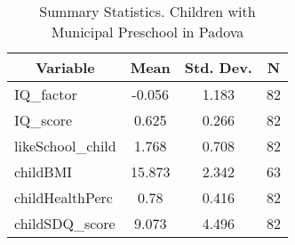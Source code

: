 
\begin{table}[htbp]\centering \caption{Summary Statistics. Children with Municipal Preschool in Padova \label{bothChildmaternaMuniPadova}}
\begin{tabular}{l c c  c}\hline\hline
\multicolumn{1}{c}{\textbf{Variable}} & \textbf{Mean}
 & \textbf{Std. Dev.} & \textbf{N}\\ \hline
IQ\_factor & -0.056 & 1.183  & 82\\
IQ\_score & 0.625 & 0.266  & 82\\
likeSchool\_child & 1.768 & 0.708  & 82\\
childBMI & 15.873 & 2.342  & 63\\
childHealthPerc & 0.78 & 0.416  & 82\\
childSDQ\_score & 9.073 & 4.496  & 82\\
\hline\end{tabular}
\end{table}
